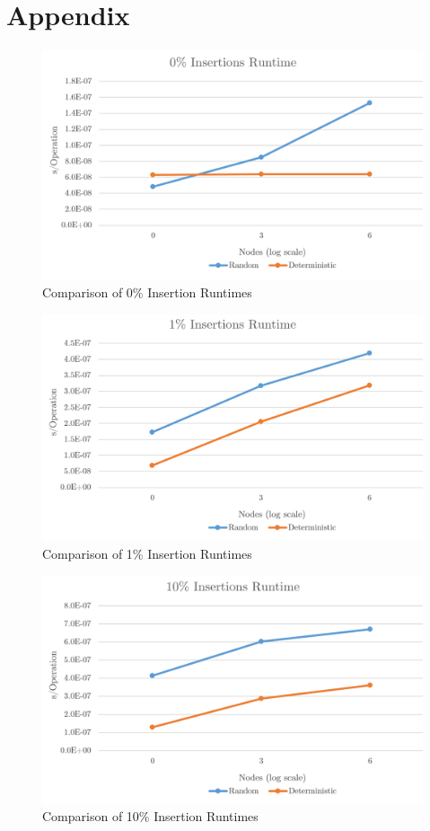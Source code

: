 \documentclass[12pt]{article}
\begin{document}
    \pagebreak
    
    \section{Appendix}
        
    \begin{figure}[ht!]
        \centering
        \includegraphics[scale=1.0]{0Insertion.png}
        \caption{Comparison of 0\% Insertion Runtimes}
        \label{fig:5}
    \end{figure}
         
    \begin{figure}[ht!]
        \centering
        \includegraphics[scale=1.0]{1Insertion.png}
        \caption{Comparison of 1\% Insertion Runtimes}
        \label{fig:6}
    \end{figure}
         
    \begin{figure}[ht!]
        \centering
        \includegraphics[scale=1.0]{10Insertion.png}
        \caption{Comparison of 10\% Insertion Runtimes}
        \label{fig:7}
    \end{figure}

    \printbibliography
\end{document}
